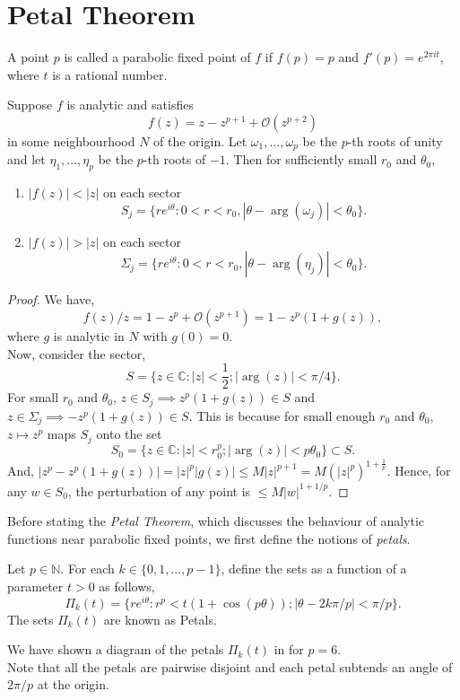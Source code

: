 \chapter{Petal Theorem}
A point \( p \) is called a parabolic fixed point of \( f \)
if \( f(p)=p \) and \( f'(p)=e^{2\pi i t} \), where \( t \)
is a rational number.

\begin{lemma}\label{lem2.1}
	Suppose \( f \) is analytic and satisfies \[
		f(z)=z-z^{p+1}+\mathcal{O}(z^{p+2})
	\] in some neighbourhood \( N \) of the origin. Let \( \omega_1,\ldots ,\omega_p \) be the \( p \)-th
	roots of unity and let \( \eta_1,\ldots ,\eta_p \) be the \( p \)-th roots of \( -1 \).
	Then for sufficiently small \( r_0 \) and \( \theta _0 \), 
	\begin{enumerate}
		\item \( |f(z)|<|z| \) on each sector \[
				S_j=\{re^{i\theta}:0<r<r_0,|\theta -\arg(\omega_j)|<\theta _0\}
		.\] 
	\item \( |f(z)|>|z| \) on each sector \[
				\Sigma_j=\{re^{i\theta}:0<r<r_0,|\theta -\arg(\eta_j)|<\theta _0\}
	.\] 
	\end{enumerate}
\end{lemma}
\begin{proof}
	We have, \[
		f(z) /z=1-z^p+\mathcal{O}(z^{p+1})=1-z^p(1+g(z))
	,\] where \( g \) is analytic in \( N \) with \( g(0)=0 \).\\
	Now, consider the sector, \[
		S=\{z\in \mathbb{C}:|z|<\frac{1}{2};|\arg(z)|<\pi /4\}
	.\] 
	For small \( r_0 \) and \( \theta_0 \), \( z\in S_j\implies z^p(1+g(z))\in S\) and \( z\in\Sigma_j\implies -z^p(1+g(z))\in S \). This is because for small enough \( r_0 \) and \( \theta_0 \), \( z\mapsto z^p \) maps \( S_j \) onto the set \[
		S_0=\{z\in \mathbb{C}:|z|<r_0^p;|\arg(z)|<p\theta_0\}\subset S
	.\] And, \( |z^p-z^p(1+g(z))|=|z|^p |g(z)|\le M|z|^{p+1}=M(|z|^p)^{1+\frac{1}{p}} \). Hence,
	for any \( w\in S_0 \), the perturbation of any point is \( \le M|w|^{1+1/p} \).

\end{proof}

Before stating the \emph{Petal Theorem}, which discusses the
behaviour of analytic functions near parabolic fixed points, we first define the notions
of \emph{petals}.
\begin{definition}[Petals]
	Let \( p\in \mathbb{N} \). For each \( k\in\{0,1,\ldots ,p-1\} \), define the sets as a function of a parameter \( t>0 \)
	as follows, \[
		\Pi_k(t)=\{re^{i\theta}:r^p<t(1+\cos (p\theta));|\theta-2k\pi /p|<\pi /p\}
	.\] 
	The sets \( \Pi_k(t) \) are known as Petals.
\end{definition}
We have shown a diagram of the petals \( \Pi_k(t) \) in  for \( p=6 \).\\
Note that all the petals are pairwise disjoint and each petal subtends an angle of \( 2\pi /p \) at the origin.

